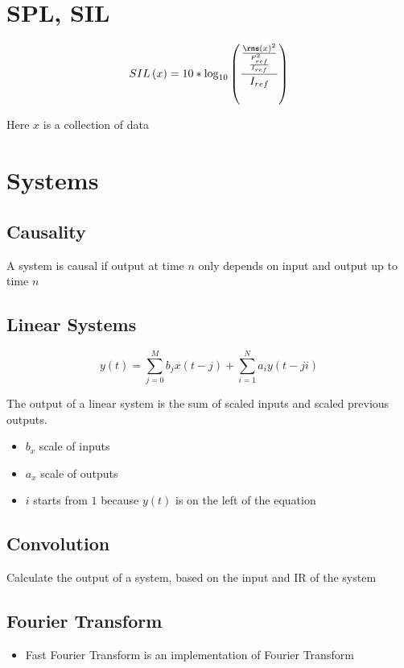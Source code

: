 \section{SPL, SIL}

  \begin{equation}
    SIL\left( x \right) = 10 * \log_{10}
    \left(
      \frac
      {
        \frac
        {
          \rms\left( x \right)^{2}
        }
        {
          \frac{P_{ref}^{2}}{I_{ref}}
        }
      }
      {I_{ref}}
    \right)
  \end{equation}

  Here $ x $ is a collection of data

\section{Systems}

  \subsection{Causality}

    A system is causal if output at time $ n $ only depends on input and output
    up to time $ n $

  \subsection{Linear Systems}

    \begin{equation}
      y\left( t \right) =
        \sum_{j = 0}^{M} b_{j} x\left( t - j \right)
        + \sum_{i = 1}^{N} a_{i} y\left( t - ji \right)
    \end{equation}

    The output of a linear system is the sum of scaled inputs and
    scaled previous outputs.

    \begin{itemize}
      \item $ b_{x} $ scale of inputs
      \item $ a_{x} $ scale of outputs
      \item $ i $ starts from $ 1 $ because $ y\left( t \right) $ is on the left
      of the equation
    \end{itemize}

  \subsection{Convolution}

    Calculate the output of a system, based on the input and IR of the system

  \subsection{Fourier Transform}

    \begin{itemize}
      \item Fast Fourier Transform is an implementation of Fourier Transform
    \end{itemize}
